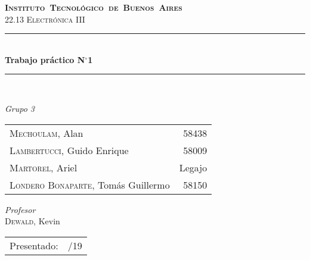 \begin{titlepage}
\newcommand{\HRule}{\rule{\linewidth}{0.5mm}}
\center
\mbox{\textsc{\LARGE \bfseries {Instituto Tecnológico de Buenos Aires}}}\\[1.5cm]
\textsc{\Large 22.13 Electrónica III}\\[0.5cm]


\HRule \\[0.6cm]
{ \Huge \bfseries Trabajo práctico N$^{\circ}$1}\\[0.4cm] 
\HRule \\[1.5cm]


{\large

\emph{Grupo 3}\\
\vspace{3px}

\begin{tabular}{lr} 	
\textsc{Mechoulam}, Alan  &  58438\\
\textsc{Lambertucci}, Guido Enrique  & 58009 \\
\textsc{Martorel}, Ariel  & Legajo \\
\textsc{Londero Bonaparte}, Tomás Guillermo  & 58150 \\
\end{tabular}

\vspace{20px}

\emph{Profesor}\\
\vspace{3px}
\textsc{Dewald}, Kevin\\	

\vspace{100px}

\begin{tabular}{ll}

Presentado: & /19\\

\end{tabular}

}

\vfill

\end{titlepage}
